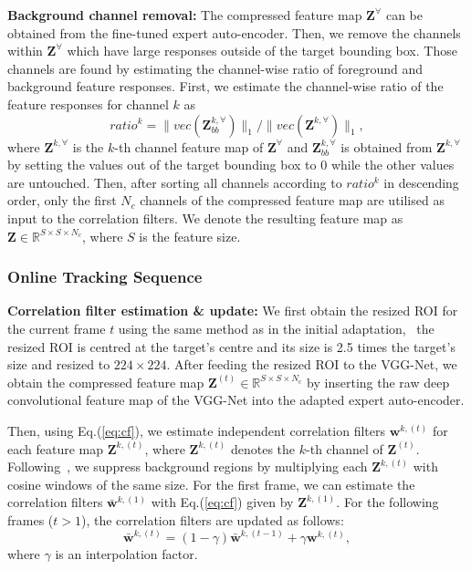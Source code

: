 \documentclass[10pt,twocolumn,letterpaper]{article}
\begin{document}
\textbf{Background channel removal: } 
The compressed feature map $\mathbf{Z}^{\forall}$ can be obtained from the fine-tuned expert auto-encoder.
Then, we remove the channels within $\mathbf{Z}^{\forall}$ which have large responses outside of the target bounding box.
Those channels are found by estimating the channel-wise ratio of foreground and background feature responses.
First, we estimate the channel-wise ratio of the feature responses for channel $k$ as 
\begin{equation}
ratio^k = \|vec(\mathbf{Z}^{k, \forall}_{bb})\|_1 / \|vec(\mathbf{Z}^{k, \forall})\|_1,
\end{equation}
where $\mathbf{Z}^{k, \forall}$ is the $k$-th channel feature map of $\mathbf{Z}^{\forall}$ and $\mathbf{Z}^{k, \forall}_{bb}$ is obtained from $\mathbf{Z}^{k, \forall}$ by setting the values out of the target bounding box to $0$ while the other values are untouched. Then, after sorting all channels according to $ratio^k$ in descending order, only the first $N_c$ channels of the compressed feature map are utilised as input to the correlation filters. We denote the resulting feature map as $\mathbf{Z}\in\mathbb{R}^{S\times S\times N_c}$, where $S$ is the feature size.



\subsubsection{Online Tracking Sequence} \label{sec:onlintTrack}
\hspace{3mm}\textbf{Correlation filter estimation \& update: }
We first obtain the resized ROI for the current frame $t$ using the same method as in the initial adaptation, \ie\ the resized ROI is centred at the target's centre and its size is 2.5 times the target's size and resized to $224\times 224$.
After feeding the resized ROI to the VGG-Net, we obtain the compressed feature map $\mathbf{Z}^{(t)}\in\mathbb{R}^{S\times S\times N_c}$ by inserting the raw deep convolutional feature map of the VGG-Net into the adapted expert auto-encoder.

Then, using Eq.(\ref{eq:cf}), we estimate independent correlation filters $\mathbf{w}^{k,(t)}$ for each feature map $\mathbf{Z}^{k,(t)}$, where $\mathbf{Z}^{k,(t)}$ denotes the $k$-th channel of $\mathbf{Z}^{(t)}$.
Following~\cite{ref:KCF}, we suppress background regions by multiplying each $\mathbf{Z}^{k,(t)}$ with cosine windows of the same size.
For the first frame, we can estimate the correlation filters $\bar{\mathbf{w}}^{k,(1)}$ with Eq.(\ref{eq:cf}) given by $\mathbf{Z}^{k,(1)}$.
For the following frames ($t>1$), the correlation filters are updated as follows:
\begin{equation}
\bar{\mathbf{w}}^{k,(t)} = (1-\gamma)\bar{\mathbf{w}}^{k,(t-1)} + \gamma\mathbf{w}^{k,(t)},
\label{eq:update}
\end{equation}
where $\gamma$ is an interpolation factor.
\end{document}
